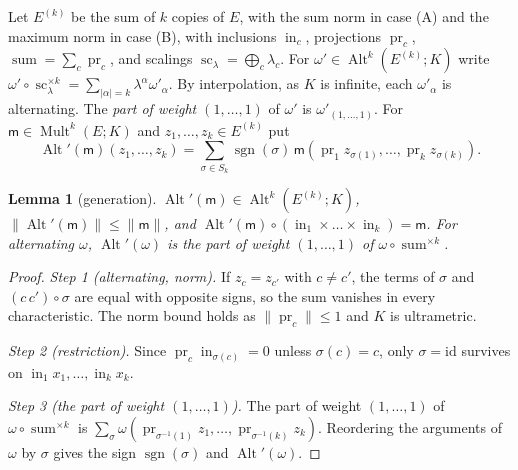 \documentclass[11pt]{amsart}
\newtheorem{lemma}[theorem]{Lemma}
\theoremstyle{definition}
\theoremstyle{remark}
\numberwithin{equation}{section}
\newcommand{\Alt}{\operatorname{Alt}}
\newcommand{\Mult}{\operatorname{Mult}}
\newcommand{\sgn}{\operatorname{sgn}}
\newcommand{\id}{\mathrm{id}}
\newcommand{\abs}[1]{\lvert #1\rvert}
\newcommand{\norm}[1]{\lVert #1\rVert}
\theoremstyle{plain}
\theoremstyle{definition}
\theoremstyle{plain}
\begin{document}
Let $E^{(k)}$ be the sum of $k$ copies of $E$, with the sum norm in case (A) and the maximum norm in case (B), with inclusions $\operatorname{in}_c$, projections $\operatorname{pr}_c$, $\operatorname{sum}=\sum_c\operatorname{pr}_c$, and scalings $\operatorname{sc}_\lambda=\bigoplus_c\lambda_c$. For $\omega'\in\Alt^k(E^{(k)};K)$ write $\omega'\circ\operatorname{sc}_\lambda^{\times k}=\sum_{\abs\alpha=k}\lambda^\alpha\omega'_\alpha$. By interpolation, as $K$ is infinite, each $\omega'_\alpha$ is alternating. The \emph{part of weight $(1,\dots,1)$} of $\omega'$ is $\omega'_{(1,\dots,1)}$. For $\mathsf m\in\Mult^k(E;K)$ and $z_1,\dots,z_k\in E^{(k)}$ put
\[
 \operatorname{Alt}'(\mathsf m)(z_1,\dots,z_k)=\sum_{\sigma\in S_k}\sgn(\sigma)\,\mathsf m(\operatorname{pr}_1z_{\sigma(1)},\dots,\operatorname{pr}_kz_{\sigma(k)}).
\]

\begin{lemma}[generation]\label{amb:lem:generation}
$\operatorname{Alt}'(\mathsf m)\in\Alt^k(E^{(k)};K)$, $\norm{\operatorname{Alt}'(\mathsf m)}\le\norm{\mathsf m}$, and $\operatorname{Alt}'(\mathsf m)\circ(\operatorname{in}_1\times\dots\times\operatorname{in}_k)=\mathsf m$. For alternating $\omega$, $\operatorname{Alt}'(\omega)$ is the part of weight $(1,\dots,1)$ of $\omega\circ\operatorname{sum}^{\times k}$.
\end{lemma}

\begin{proof}
\emph{Step 1 (alternating, norm).} If $z_c=z_{c'}$ with $c\ne c'$, the terms of $\sigma$ and $(c\,c')\circ\sigma$ are equal with opposite signs, so the sum vanishes in every characteristic. The norm bound holds as $\norm{\operatorname{pr}_c}\le1$ and $K$ is ultrametric.

\emph{Step 2 (restriction).} Since $\operatorname{pr}_c\operatorname{in}_{\sigma(c)}=0$ unless $\sigma(c)=c$, only $\sigma=\id$ survives on $\operatorname{in}_1x_1,\dots,\operatorname{in}_kx_k$.

\emph{Step 3 (the part of weight $(1,\dots,1)$).} The part of weight $(1,\dots,1)$ of $\omega\circ\operatorname{sum}^{\times k}$ is $\sum_{\sigma}\omega(\operatorname{pr}_{\sigma^{-1}(1)}z_1,\dots,\operatorname{pr}_{\sigma^{-1}(k)}z_k)$. Reordering the arguments of $\omega$ by $\sigma$ gives the sign $\sgn(\sigma)$ and $\operatorname{Alt}'(\omega)$.
\end{proof}
\end{document}
